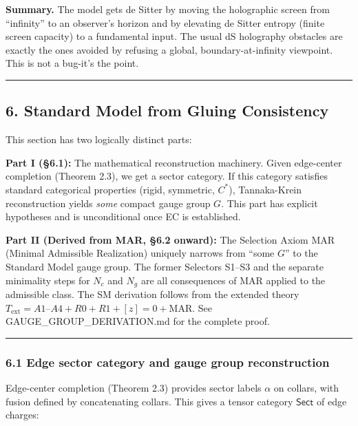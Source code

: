 \documentclass[
]{article}
\begin{document}
\textbf{Summary.} The model gets de Sitter by moving the holographic
screen from ``infinity'' to an observer's horizon and by elevating de
Sitter entropy (finite screen capacity) to a fundamental input. The
usual dS holography obstacles are exactly the ones avoided by refusing a
global, boundary-at-infinity viewpoint. This is not a bug-it's the
point.

\begin{center}\rule{0.5\linewidth}{0.5pt}\end{center}

\subsection{6. Standard Model from Gluing
Consistency}\label{standard-model-from-gluing-consistency}

This section has two logically distinct parts:

\textbf{Part I (§6.1):} The mathematical reconstruction machinery. Given
edge-center completion (Theorem 2.3), we get a sector category. If this
category satisfies standard categorical properties (rigid, symmetric,
\(C^*\)), Tannaka-Krein reconstruction yields \emph{some} compact gauge
group \(G\). This part has explicit hypotheses and is unconditional once
EC is established.

\textbf{Part II (Derived from MAR, §6.2 onward):} The Selection Axiom
MAR (Minimal Admissible Realization) uniquely narrows from ``some
\(G\)'' to the Standard Model gauge group. The former Selectors S1--S3
and the separate minimality steps for \(N_c\) and \(N_g\) are all
consequences of MAR applied to the admissible class. The SM derivation
follows from the extended theory
\(T_{\mathrm{ext}} = A1\text{–}A4 + R0 + R1 + [z]=0 + \mathrm{MAR}\).
See GAUGE\_GROUP\_DERIVATION.md for the complete proof.

\begin{center}\rule{0.5\linewidth}{0.5pt}\end{center}

\subsubsection{6.1 Edge sector category and gauge group
reconstruction}\label{edge-sector-category-and-gauge-group-reconstruction}

Edge-center completion (Theorem 2.3) provides sector labels \(\alpha\)
on collars, with fusion defined by concatenating collars. This gives a
tensor category \(\mathsf{Sect}\) of edge charges:
\end{document}
